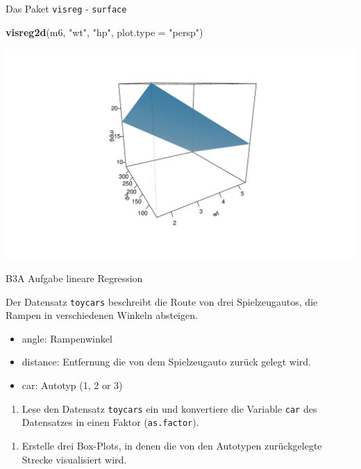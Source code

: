 \documentclass[ignorenonframetext,]{beamer}
\newenvironment{Shaded}{\begin{snugshade}}{\end{snugshade}}
\newcommand{\KeywordTok}[1]{\textcolor[rgb]{0.13,0.29,0.53}{\textbf{#1}}}
\newcommand{\DataTypeTok}[1]{\textcolor[rgb]{0.13,0.29,0.53}{#1}}
\newcommand{\StringTok}[1]{\textcolor[rgb]{0.31,0.60,0.02}{#1}}
\newcommand{\NormalTok}[1]{#1}
\providecommand{\tightlist}{%
  \setlength{\itemsep}{0pt}\setlength{\parskip}{0pt}}
\begin{document}
\begin{frame}[fragile]{Das Paket \texttt{visreg} - \texttt{surface}}

\begin{Shaded}
\begin{Highlighting}[]
\KeywordTok{visreg2d}\NormalTok{(m6, }\StringTok{"wt"}\NormalTok{, }\StringTok{"hp"}\NormalTok{, }\DataTypeTok{plot.type =} \StringTok{"persp"}\NormalTok{)}
\end{Highlighting}
\end{Shaded}

\includegraphics{B3_linreg_files/figure-beamer/unnamed-chunk-44-1.pdf}

\end{frame}

\begin{frame}[fragile]{B3A Aufgabe lineare Regression}

Der Datensatz \texttt{toycars} beschreibt die Route von drei
Spielzeugautos, die Rampen in verschiedenen Winkeln absteigen.

\begin{itemize}
\tightlist
\item
  angle: Rampenwinkel
\item
  distance: Entfernung die von dem Spielzeugauto zurück gelegt wird.
\item
  car: Autotyp (1, 2 or 3)
\end{itemize}

\begin{enumerate}
\def\labelenumi{\alph{enumi})}
\tightlist
\item
  Lese den Datensatz \texttt{toycars} ein und konvertiere die Variable
  \texttt{car} des Datensatzes in einen Faktor (\texttt{as.factor}).
\end{enumerate}

\begin{enumerate}
\def\labelenumi{(\alph{enumi})}
\setcounter{enumi}{1}
\tightlist
\item
  Erstelle drei Box-Plots, in denen die von den Autotypen zurückgelegte
  Strecke visualisiert wird.
\end{enumerate}

\end{frame}
\end{document}
